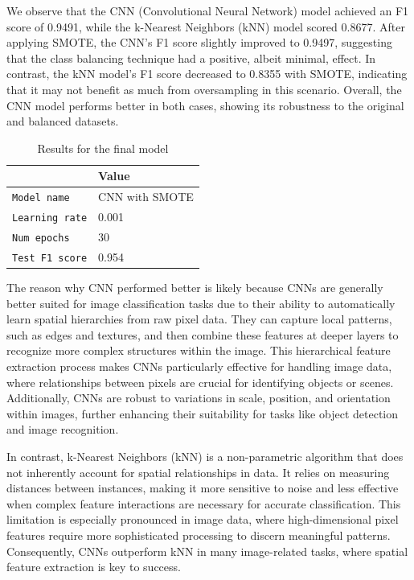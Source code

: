 \documentclass{article}
\begin{document}
We observe that the CNN (Convolutional Neural Network) model achieved an F1 score of 0.9491, while the k-Nearest Neighbors (kNN) model scored 0.8677. After applying SMOTE, the CNN’s F1 score slightly improved to 0.9497, suggesting that the class balancing technique had a positive, albeit minimal, effect. In contrast, the kNN model’s F1 score decreased to 0.8355 with SMOTE, indicating that it may not benefit as much from oversampling in this scenario. Overall, the CNN model performs better in both cases, showing its robustness to the original and balanced datasets. 
\begin{table}[ht]
    \centering
    \begin{tabular}{|l|l|}
        \hline
        \textbf{} & \textbf{Value} \\
        \hline
        \texttt{Model name} & CNN with SMOTE\\
        \hline
        \texttt{Learning rate} & 0.001 \\
        \hline
        \texttt{Num epochs} & 30 \\
        \hline
        \texttt{Test F1 score} & 0.954 \\  
        \hline
    \end{tabular}
    \caption{Results for the final model}
\end{table}

The reason why CNN performed better is likely because CNNs are generally better suited for image classification tasks due to their ability to automatically learn spatial hierarchies from raw pixel data. They can capture local patterns, such as edges and textures, and then combine these features at deeper layers to recognize more complex structures within the image. This hierarchical feature extraction process makes CNNs particularly effective for handling image data, where relationships between pixels are crucial for identifying objects or scenes. Additionally, CNNs are robust to variations in scale, position, and orientation within images, further enhancing their suitability for tasks like object detection and image recognition.

In contrast, k-Nearest Neighbors (kNN) is a non-parametric algorithm that does not inherently account for spatial relationships in data. It relies on measuring distances between instances, making it more sensitive to noise and less effective when complex feature interactions are necessary for accurate classification. This limitation is especially pronounced in image data, where high-dimensional pixel features require more sophisticated processing to discern meaningful patterns. Consequently, CNNs outperform kNN in many image-related tasks, where spatial feature extraction is key to success.
\end{document}

